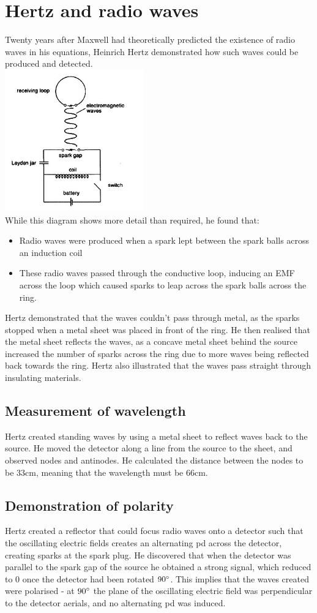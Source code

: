\documentclass[12pt]{article}
\begin{document}
\section{Hertz and radio waves}
Twenty years after Maxwell had theoretically predicted the existence of radio waves in his equations, Heinrich Hertz demonstrated how such waves could be produced and detected.\\
\includegraphics[width=6cm]{hertz_1.jpg}\\
While this diagram shows more detail than required, he found that:
\begin{itemize}
\item Radio waves were produced when a spark lept between the spark balls across an induction coil
\item These radio waves passed through the conductive loop, inducing an EMF across the loop which caused sparks to leap across the spark balls across the ring.
\end{itemize}
Hertz demonstrated that the waves couldn't pass through metal, as the sparks stopped when a metal sheet was placed in front of the ring. He then realised that the metal sheet reflects the waves, as a concave metal sheet behind the source increased the number of sparks across the ring due to more waves being reflected back towards the ring. Hertz also illustrated that the waves pass straight through insulating materials.
\subsection{Measurement of wavelength}
Hertz created standing waves by using a metal sheet to reflect waves back to the source. He moved the detector along a line from the source to the sheet, and observed nodes and antinodes. He calculated the distance between the nodes to be 33cm, meaning that the wavelength must be 66cm.
\subsection{Demonstration of polarity}
Hertz created a reflector that could focus radio waves onto a detector such that the oscillating electric fields creates an alternating pd across the detector, creating sparks at the spark plug. He discovered that when the detector was parallel to the spark gap of the source he obtained a strong signal, which reduced to 0 once the detector had been rotated $90\degree$. This implies that the waves created were polarised - at $90\degree$ the plane of the oscillating electric field was perpendicular to the detector aerials, and no alternating pd was induced.
\end{document}
